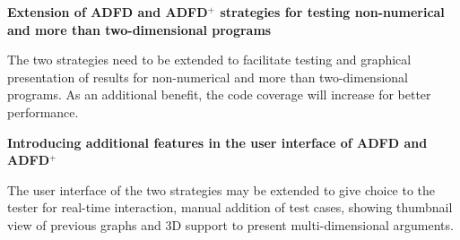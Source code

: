 

\textbf{Extension of ADFD and ADFD$^+$ strategies for testing non-numerical and more than two-dimensional programs}

The two strategies need to be extended to facilitate testing and graphical presentation of results for non-numerical and more than two-dimensional programs. As an additional benefit, the code coverage will increase for better performance.\\









\clearpage
\newpage

\textbf{Introducing additional features in the user interface of ADFD and ADFD$^+$}

The user interface of the two strategies may be extended to give choice to the tester for real-time interaction, manual addition of test cases, showing thumbnail view of previous graphs and 3D support to present multi-dimensional arguments.\\



